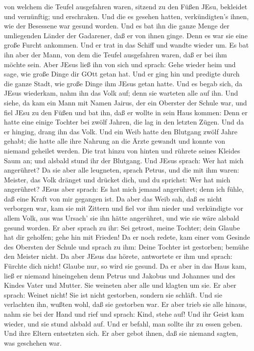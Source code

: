 von welchem die Teufel ausgefahren waren, sitzend zu den Füßen JEsu,
bekleidet und vernünftig; und erschraken.  Und die es
gesehen hatten, verkündigten's ihnen, wie der Besessene war gesund
worden.  Und es bat ihn die ganze Menge der umliegenden
Länder der Gadarener, daß er von ihnen ginge. Denn es war sie eine große
Furcht ankommen. Und er trat in das Schiff und wandte wieder um.
 Es bat ihn aber der Mann, von dem die Teufel ausgefahren
waren, daß er bei ihm möchte sein. Aber JEsus ließ ihn von sich und
sprach:  Gehe wieder heim und sage, wie große Dinge dir
GOtt getan hat. Und er ging hin und predigte durch die ganze Stadt, wie
große Dinge ihm JEsus getan hatte.  Und es begab sich, da
JEsus wiederkam, nahm ihn das Volk auf; denn sie warteten alle auf ihn.
 Und siehe, da kam ein Mann mit Namen Jairus, der ein
Oberster der Schule war, und fiel JEsu zu den Füßen und bat ihn, daß er
wollte in sein Haus kommen:  Denn er hatte eine einige
Tochter bei zwölf Jahren, die lag in den letzten Zügen. Und da er
hinging, drang ihn das Volk.  Und ein Weib hatte den
Blutgang zwölf Jahre gehabt; die hatte alle ihre Nahrung an die Ärzte
gewandt und konnte von niemand geheilet werden.  Die trat
hinzu von hinten und rührete seines Kleides Saum an; und alsbald stund
ihr der Blutgang.  Und JEsus sprach: Wer hat mich
angerühret? Da sie aber alle leugneten, sprach Petrus, und die mit ihm
waren: Meister, das Volk dränget und drücket dich, und du sprichst: Wer
hat mich angerühret?  JEsus aber sprach: Es hat mich jemand
angerühret; denn ich fühle, daß eine Kraft von mir gegangen ist.
 Da aber das Weib sah, daß es nicht verborgen war, kam sie
mit Zittern und fiel vor ihm nieder und verkündigte vor allem Volk, aus
was Ursach' sie ihn hätte angerühret, und wie sie wäre alsbald gesund
worden.  Er aber sprach zu ihr: Sei getrost, meine Tochter;
dein Glaube hat dir geholfen; gehe hin mit Frieden!  Da er
noch redete, kam einer vom Gesinde des Obersten der Schule und sprach zu
ihm: Deine Tochter ist gestorben; bemühe den Meister nicht.
 Da aber JEsus das hörete, antwortete er ihm und sprach:
Fürchte dich nicht! Glaube nur, so wird sie gesund.  Da er
aber in das Haus kam, ließ er niemand hineingehen denn Petrus und
Jakobus und Johannes und des Kindes Vater und Mutter.  Sie
weineten aber alle und klagten um sie. Er aber sprach: Weinet nicht! Sie
ist nicht gestorben, sondern sie schläft.  Und sie
verlachten ihn, wußten wohl, daß sie gestorben war.  Er
aber trieb sie alle hinaus, nahm sie bei der Hand und rief und sprach:
Kind, stehe auf!  Und ihr Geist kam wieder, und sie stund
alsbald auf. Und er befahl, man sollte ihr zu essen geben. 
Und ihre Eltern entsetzten sich. Er aber gebot ihnen, daß sie niemand
sagten, was geschehen war.

